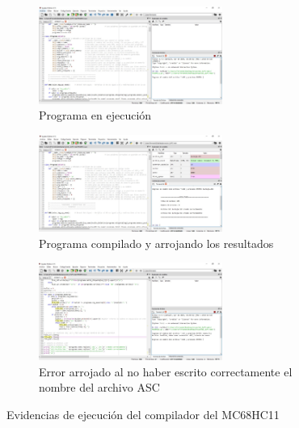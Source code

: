 \documentclass[letterpaper]{report}
\begin{document}
    \begin{figure}[h]
        \centering
        \begin{subfigure}{7cm}
            \includegraphics[width = 6cm]{img/E1}
            \caption{Programa en ejecución}
        \end{subfigure}
        \begin{subfigure}{7cm}
            \includegraphics[width = 6cm]{img/E2}
            \caption{Programa compilado y arrojando los resultados}
        \end{subfigure}
        \begin{subfigure}{7cm}
            \includegraphics[width = 6cm]{img/E3}
            \caption{Error arrojado al no haber escrito correctamente el nombre
            del archivo ASC}
        \end{subfigure}
        \caption{Evidencias de ejecución del compilador del MC68HC11}
    \end{figure}
\end{document}

